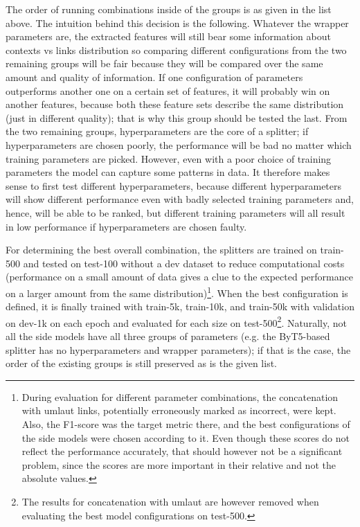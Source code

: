 \documentclass[11pt]{article}
\begin{document}
The order of running combinations inside of the groups is as given in the list above. The intuition behind this decision is the following. Whatever the wrapper parameters are, the extracted features will still bear some information about contexts vs links distribution so comparing different configurations from the two remaining groups will be fair because they will be compared over the same amount and quality of information. If one configuration of parameters outperforms another one on a certain set of features, it will probably win on another features, because both these feature sets describe the same distribution (just in different quality); that is why this group should be tested the last. From the two remaining groups, hyperparameters are the core of a splitter; if hyperparameters are chosen poorly, the performance will be bad no matter which training parameters are picked. However, even with a poor choice of training parameters the model can capture some patterns in data. It therefore makes sense to first test different hyperparameters, because different hyperparameters will show different performance even with badly selected training parameters and, hence, will be able to be ranked, but different training parameters will all result in low performance if hyperparameters are chosen faulty.

For determining the best overall combination, the splitters are trained on train-500 and tested on test-100 without a dev dataset to reduce computational costs (performance on a small amount of data gives a clue to the expected performance on a larger amount from the same distribution)\footnote{During evaluation for different parameter combinations, the concatenation with umlaut links, potentially erroneously marked as incorrect, were kept. Also, the F1-score was the target metric there, and the best configurations of the side models were chosen according to it. Even though these scores do not reflect the performance accurately, that should however not be a significant problem, since the scores are more important in their relative and not the absolute values.}. When the best configuration is defined, it is finally trained with train-5k, train-10k, and train-50k with validation on dev-1k on each epoch and evaluated for each size on test-500\footnote{The results for concatenation with umlaut are however removed when evaluating the best model configurations on test-500.}. Naturally, not all the side models have all three groups of parameters (e.g. the ByT5-based splitter has no hyperparameters and wrapper parameters); if that is the case, the order of the existing groups is still preserved as is the given list.
\end{document}

